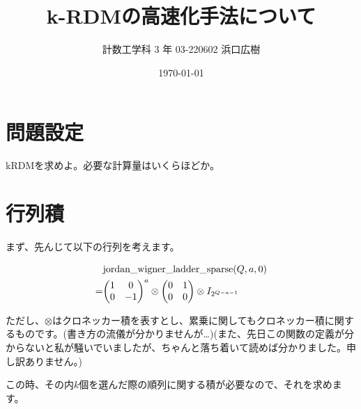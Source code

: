 \documentclass[a4paper, 10pt, dvipdfmx]{jlreq}
\begin{document}
\title{k-RDMの高速化手法について}
\author{計数工学科 3 年 03-220602 浜口広樹}
\date{\today}
\maketitle

\section{問題設定}


kRDMを求めよ。必要な計算量はいくらほどか。

\section{行列積}

まず、先んじて以下の行列を考えます。

\begin{align*}
      & \text{jordan\_wigner\_ladder\_sparse}(Q,a,0)     \\
    = & \mqty(1                                      & 0 \\ 0 & -1)^a \otimes \mqty(0&1\\0&0) \otimes I_{2^{Q-a-1}} \\
\end{align*}

ただし、$\otimes$はクロネッカー積を表すとし、累乗に関してもクロネッカー積に関するものです。(書き方の流儀が分かりませんが…)(また、先日この関数の定義が分からないと私が騒いでいましたが、ちゃんと落ち着いて読めば分かりました。申し訳ありません。)

この時、その内$k$個を選んだ際の順列に関する積が必要なので、それを求めます。

\newpage
\end{document}
